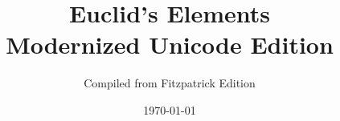 \documentclass[12pt,a4paper]{book}
\begin{document}
\frontmatter
\title{Euclid's Elements\\{\large Modernized Unicode Edition}}
\author{Compiled from Fitzpatrick Edition}
\date{\today}
\maketitle

\tableofcontents

\mainmatter

\backmatter
\end{document}
